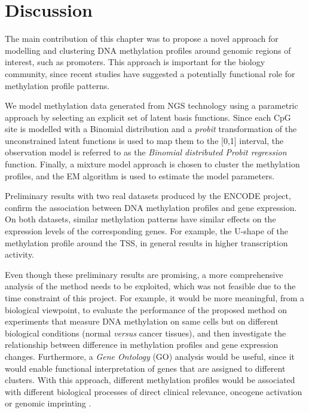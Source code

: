 \section{Discussion} \label{meth-discussion-sect}
The main contribution of this chapter was to propose a novel approach for modelling and clustering DNA methylation profiles around genomic regions of interest, such as promoters. This approach is important for the biology community, since recent studies have suggested a potentially functional role for methylation profile patterns.

We model methylation data generated from NGS technology using a parametric approach by selecting an explicit set of latent basis functions. Since each CpG site is modelled with a Binomial distribution and a \emph{probit} transformation of the unconstrained latent functions is used to map them to the [0,1] interval, the observation model is referred to as the \emph{Binomial distributed Probit regression} function. Finally, a mixture model approach is chosen to cluster the methylation profiles, and the EM algorithm is used to estimate the model parameters. 

Preliminary results with two real datasets produced by the ENCODE project, confirm the association between DNA methylation profiles and gene expression. On both datasets, similar methylation patterns have similar effects on the expression levels of the corresponding genes. For example, the U-shape of the methylation profile around the TSS, in general results in higher transcription activity. 

Even though these preliminary results are promising, a more comprehensive analysis of the method needs to be exploited, which was not feasible due to the time constraint of this project. For example, it would be more meaningful, from a biological viewpoint, to evaluate the performance of the proposed method on experiments that measure DNA methylation on same cells but on different biological conditions (\eg normal \emph{versus} cancer tissues), and then investigate the relationship between difference in methylation profiles and gene expression changes. Furthermore, a \emph{Gene Ontology} (GO) \citep{Ashburner2000} analysis would be useful, since it would enable functional interpretation of genes that are assigned to different clusters. With this approach, different methylation profiles would be associated with different biological processes of direct clinical relevance, \eg oncogene activation or genomic imprinting \citep{Li1993}. 

